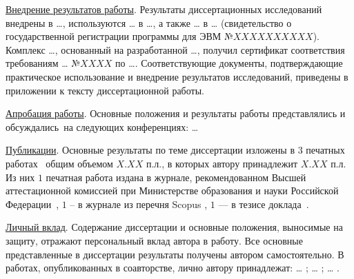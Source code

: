 \underline{Внедрение результатов работы}. Результаты диссертационных
исследований внедрены в \dots{}, используются \dots{} в \dots{}, а
также \dots{} в \dots{} (свидетельство о государственной регистрации
программы для ЭВМ №$XXXXXXXXXX$). Комплекс \dots{}, основанный на
разработанной \dots{}, получил сертификат соответствия требованиям
\dots{} №$XXXX$ по \dots{}. Соответствующие документы, подтверждающие
практическое использование и внедрение результатов исследований,
приведены в приложении к тексту диссертационной работы.

\underline{Апробация работы}. Основные положения и результаты работы
представлялись и обсуждались~на следующих конференциях: \dots{}

\underline{Публикации}. Основные результаты по теме диссертации
изложены в $3$ печатных работах~\cite{article_pub, article_vak,
  article_scopus} общим объемом $X.XX$ п.л., в которых автору
принадлежит $X.XX$ п.л. Из них $1$ печатная работа издана в журнале,
рекомендованном Высшей аттестационной комиссией при Министерстве
образования и науки Российской Федерации~\cite{article_vak}, $1$ -- в
журнале из перечня Scopus \cite{article_scopus}, $1$ --- в тезисе
доклада~\cite{article_pub}.

\underline{Личный вклад}. Содержание диссертации и основные положения,
выносимые на защиту, отражают персональный вклад автора в работу. Все
основные представленные в диссертации результаты получены автором
самостоятельно. В работах, опубликованных в соавторстве, лично автору
принадлежат: \dots{} \cite{article_pub}; \dots{} \cite{article_vak};
\dots{} \cite{article_scopus}.

